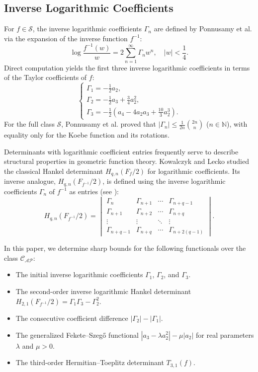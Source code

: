 \documentclass[10pt,a4paper]{amsart}
\numberwithin{equation}{section}
\begin{document}
\subsection{Inverse Logarithmic Coefficients}
For $f\in\mathcal{S}$, the inverse logarithmic coefficients $\Gamma_n$ are defined by Ponnusamy et al. \cite{Ponnusamy2018} via the expansion of the inverse function $f^{-1}$:
\[
\log\frac{f^{-1}(w)}{w} = 2\sum_{n=1}^{\infty}\Gamma_n w^n, \quad |w|<\frac{1}{4}.
\]
Direct computation yields the first three inverse logarithmic coefficients in terms of the Taylor coefficients of $f$:
\begin{equation}\label{IG1}
\begin{cases}
\Gamma_1 = -\frac{1}{2} a_2, \\
\Gamma_2 = -\frac{1}{2} a_3 + \frac{3}{4} a_2^2, \\
\Gamma_3 = -\frac{1}{2} \left( a_4 - 4a_2 a_3 + \frac{10}{3} a_2^3 \right).
\end{cases}
\end{equation}
For the full class $\mathcal{S}$, Ponnusamy et al. \cite{Ponnusamy2018} proved that $|\Gamma_n| \le \frac{1}{2n}\binom{2n}{n}$ ($n\in\mathbb{N}$), with equality only for the Koebe function and its rotations.

Determinants with logarithmic coefficient entries frequently serve to describe structural properties in geometric function theory. Kowalczyk and Lecko \cite{12,15} studied the classical Hankel determinant $H_{q,n}(F_f/2)$ for logarithmic coefficients. Its inverse analogue, $H_{q,n}(F_{f^{-1}}/2)$, is defined using the inverse logarithmic coefficients $\Gamma_n$ of $f^{-1}$ as entries (see \cite{16}):
\[
H_{q,n}\left(F_{f^{-1}}/2\right)
=
\begin{vmatrix}
\Gamma_n & \Gamma_{n+1} & \cdots & \Gamma_{n+q-1} \\
\Gamma_{n+1} & \Gamma_{n+2} & \cdots & \Gamma_{n+q} \\
\vdots & \vdots & \ddots & \vdots \\
\Gamma_{n+q-1} & \Gamma_{n+q} & \cdots & \Gamma_{n+2(q-1)}
\end{vmatrix}.
\]

In this paper, we determine sharp bounds for the following functionals over the class $\mathcal{C}_{\mathcal{AP}}$:
\begin{itemize}
\item The initial inverse logarithmic coefficients $\Gamma_1$, $\Gamma_2$, and $\Gamma_3$.
\item The second-order inverse logarithmic Hankel determinant $H_{2,1}(F_{f^{-1}}/2) = \Gamma_1\Gamma_3-\Gamma_2^2$.
\item The consecutive coefficient difference $|\Gamma_2|-|\Gamma_1|$.
\item The generalized Fekete--Szeg\H{o} functional $|a_3 - \lambda a_2^2| - \mu |a_2|$ for real parameters $\lambda$ and $\mu > 0$.
\item The third-order Hermitian--Toeplitz determinant $T_{3,1}(f)$.
\end{itemize}
\end{document}
